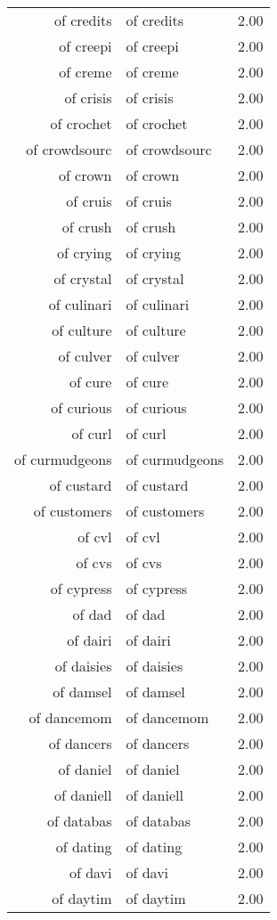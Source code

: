 \begin{table}[ht]
\begin{tabular}{rlr}
  of credits & of credits & 2.00 \\ 
  of creepi & of creepi & 2.00 \\ 
  of creme & of creme & 2.00 \\ 
  of crisis & of crisis & 2.00 \\ 
  of crochet & of crochet & 2.00 \\ 
  of crowdsourc & of crowdsourc & 2.00 \\ 
  of crown & of crown & 2.00 \\ 
  of cruis & of cruis & 2.00 \\ 
  of crush & of crush & 2.00 \\ 
  of crying & of crying & 2.00 \\ 
  of crystal & of crystal & 2.00 \\ 
  of culinari & of culinari & 2.00 \\ 
  of culture & of culture & 2.00 \\ 
  of culver & of culver & 2.00 \\ 
  of cure & of cure & 2.00 \\ 
  of curious & of curious & 2.00 \\ 
  of curl & of curl & 2.00 \\ 
  of curmudgeons & of curmudgeons & 2.00 \\ 
  of custard & of custard & 2.00 \\ 
  of customers & of customers & 2.00 \\ 
  of cvl & of cvl & 2.00 \\ 
  of cvs & of cvs & 2.00 \\ 
  of cypress & of cypress & 2.00 \\ 
  of dad & of dad & 2.00 \\ 
  of dairi & of dairi & 2.00 \\ 
  of daisies & of daisies & 2.00 \\ 
  of damsel & of damsel & 2.00 \\ 
  of dancemom & of dancemom & 2.00 \\ 
  of dancers & of dancers & 2.00 \\ 
  of daniel & of daniel & 2.00 \\ 
  of daniell & of daniell & 2.00 \\ 
  of databas & of databas & 2.00 \\ 
  of dating & of dating & 2.00 \\ 
  of davi & of davi & 2.00 \\ 
  of daytim & of daytim & 2.00 \\ 

\end{tabular}
\end{table}
